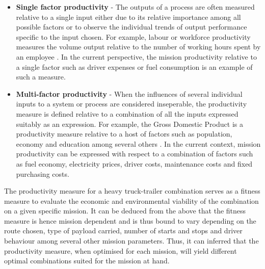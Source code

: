\documentclass[ExampleMasters.tex]{subfiles}
\begin{document}
		\begin{itemize}
			\item \textbf{Single factor productivity} - The outputs of a process are often measured relative to a single input either due to its relative importance among all possible factors or to observe the individual trends of output performance specific to the input chosen. For example, labour or workforce productivity measures the volume output relative to the number of working hours spent by an employee \cite{TruckProdAus, WikiLabourProd}. In the current perspective, the mission productivity relative to a single factor such as driver expenses or fuel consumption is an example of such a measure.

			\item \textbf{Multi-factor productivity} - When the influences of several individual inputs to a system or process are considered inseperable, the productivity measure is defined relative to a combination of all the inputs expressed suitably as an expression. For example, the Gross Domestic Product is a productivity measure relative to a host of factors such as population, economy and education among several others \cite{TruckProdAus, WikiGDP}. In the current context, mission productivity can be expressed with respect to a combination of factors such as fuel economy, electricity prices, driver costs, maintenance costs and fixed purchasing costs. 
		\end{itemize}

		The productivity measure for a heavy truck-trailer combination serves as a fitness measure to evaluate the economic and environmental viability of the combination on a given specific mission. It can be deduced from the above that the fitness measure is hence mission dependent and is thus bound to vary depending on the route chosen, type of payload carried, number of starts and stops and driver behaviour among several other mission parameters. Thus, it can inferred that the productivity measure, when optimised for each mission, will yield different optimal combinations suited for the mission at hand.\\
\end{document}
